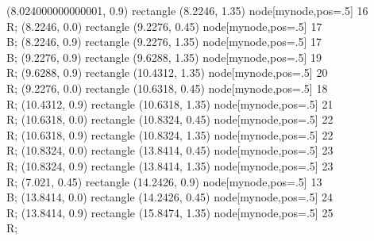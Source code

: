  (8.024000000000001, 0.9) rectangle (8.2246, 1.35) node[mynode,pos=.5] {16 \\ R};
 (8.2246, 0.0) rectangle (9.2276, 0.45) node[mynode,pos=.5] {17 \\ B};
 (8.2246, 0.9) rectangle (9.2276, 1.35) node[mynode,pos=.5] {17 \\ B};
 (9.2276, 0.9) rectangle (9.6288, 1.35) node[mynode,pos=.5] {19 \\ R};
 (9.6288, 0.9) rectangle (10.4312, 1.35) node[mynode,pos=.5] {20 \\ R};
 (9.2276, 0.0) rectangle (10.6318, 0.45) node[mynode,pos=.5] {18 \\ R};
 (10.4312, 0.9) rectangle (10.6318, 1.35) node[mynode,pos=.5] {21 \\ R};
 (10.6318, 0.0) rectangle (10.8324, 0.45) node[mynode,pos=.5] {22 \\ R};
 (10.6318, 0.9) rectangle (10.8324, 1.35) node[mynode,pos=.5] {22 \\ R};
 (10.8324, 0.0) rectangle (13.8414, 0.45) node[mynode,pos=.5] {23 \\ R};
 (10.8324, 0.9) rectangle (13.8414, 1.35) node[mynode,pos=.5] {23 \\ R};
 (7.021, 0.45) rectangle (14.2426, 0.9) node[mynode,pos=.5] {13 \\ B};
 (13.8414, 0.0) rectangle (14.2426, 0.45) node[mynode,pos=.5] {24 \\ R};
 (13.8414, 0.9) rectangle (15.8474, 1.35) node[mynode,pos=.5] {25 \\ R};